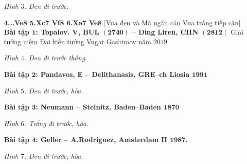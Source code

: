 \begin{multicols}{2}
	\begin{center}
		\newgame
		\scalebox{0.85}\showboard
		\vskip 0.2cm
		\textit{\small\color{gocco}Hình $3$. Đen đi trước.}
	\end{center}
	\textbf{\color{gocco}$\pmb{4}$...Ve$\pmb{8}$ $\pmb{5}$.Xc$\pmb{7}$ Vf$\pmb{8}$ $\pmb{6}$.Xa$\pmb{7}$ Ve$\pmb{8}$} [Vua đen và Mã ngăn cản Vua trắng tiếp cận]
	\vskip 0.1cm
	\textbf{\color{gocco}Bài tập $\pmb{1}$: Topalov. V, BUL $\pmb{(2740)}$ -- Ding Liren, CHN $\pmb{(2812)}$}
	\vskip 0.1cm
	Giải tưởng niệm Đại kiện tướng Vugar Gashimov  năm $2019$
	\begin{center}
		\newgame
		\scalebox{0.85}\showboard
		\vskip 0.2cm
		\textit{\small\color{gocco}Hình $4$. Đen đi trước thắng.}
	\end{center}
	\textbf{\color{gocco}Bài tập $\pmb{2}$: Pandavos, E -- Delithanasis, GRE--ch Liosia $\pmb{1991}$}
	\begin{center}
		\newgame
		\scalebox{0.85}\showboard
		\vskip 0.2cm
		\textit{\small\color{gocco}Hình $5$. Đen đi trước, hòa.}
	\end{center}
	\columnbreak
	\textbf{\color{gocco}Bài tập $\pmb{3}$: Neumann -- Steinitz, Baden--Baden $\pmb{1870}$}
	\begin{center}
		\newgame
		\scalebox{0.85}\showboard
		\vskip 0.2cm
		\textit{\small\color{gocco}Hình $6$. Trắng đi trước, hòa.}
	\end{center}
	\textbf{\color{gocco}Bài tập $\pmb{4}$: Geller -- A.Rodriguez, Amsterdam II $\pmb{1987}$.}
	\begin{center}
		\newgame
		\scalebox{0.85}\showboard
		\vskip 0.2cm
		\textit{\small\color{gocco}Hình $7$. Đen đi trước, hòa.}
	\end{center}

\end{multicols}
